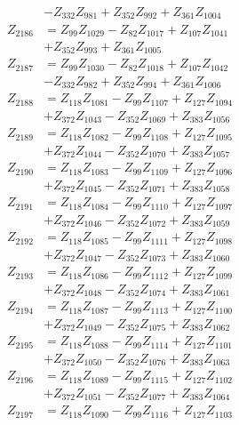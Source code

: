 \begin{multicols}{2}
\begin{align}
&- Z_{332}Z_{981} + Z_{352}Z_{992} + Z_{361}Z_{1004} \nonumber \\
Z_{2186} &= Z_{99}Z_{1029} - Z_{82}Z_{1017} + Z_{107}Z_{1041}  \nonumber \\
&+ Z_{352}Z_{993} + Z_{361}Z_{1005} \nonumber \\
Z_{2187} &= Z_{99}Z_{1030} - Z_{82}Z_{1018} + Z_{107}Z_{1042}  \nonumber \\
&- Z_{332}Z_{982} + Z_{352}Z_{994} + Z_{361}Z_{1006} \nonumber \\
Z_{2188} &= Z_{118}Z_{1081} - Z_{99}Z_{1107} + Z_{127}Z_{1094}  \nonumber \\
&+ Z_{372}Z_{1043} - Z_{352}Z_{1069} + Z_{383}Z_{1056} \nonumber \\
Z_{2189} &= Z_{118}Z_{1082} - Z_{99}Z_{1108} + Z_{127}Z_{1095}  \nonumber \\
&+ Z_{372}Z_{1044} - Z_{352}Z_{1070} + Z_{383}Z_{1057} \nonumber \\
Z_{2190} &= Z_{118}Z_{1083} - Z_{99}Z_{1109} + Z_{127}Z_{1096}  \nonumber \\
&+ Z_{372}Z_{1045} - Z_{352}Z_{1071} + Z_{383}Z_{1058} \nonumber \\
Z_{2191} &= Z_{118}Z_{1084} - Z_{99}Z_{1110} + Z_{127}Z_{1097}  \nonumber \\
&+ Z_{372}Z_{1046} - Z_{352}Z_{1072} + Z_{383}Z_{1059} \nonumber \\
Z_{2192} &= Z_{118}Z_{1085} - Z_{99}Z_{1111} + Z_{127}Z_{1098}  \nonumber \\
&+ Z_{372}Z_{1047} - Z_{352}Z_{1073} + Z_{383}Z_{1060} \nonumber \\
Z_{2193} &= Z_{118}Z_{1086} - Z_{99}Z_{1112} + Z_{127}Z_{1099}  \nonumber \\
&+ Z_{372}Z_{1048} - Z_{352}Z_{1074} + Z_{383}Z_{1061} \nonumber \\
Z_{2194} &= Z_{118}Z_{1087} - Z_{99}Z_{1113} + Z_{127}Z_{1100}  \nonumber \\
&+ Z_{372}Z_{1049} - Z_{352}Z_{1075} + Z_{383}Z_{1062} \nonumber \\
Z_{2195} &= Z_{118}Z_{1088} - Z_{99}Z_{1114} + Z_{127}Z_{1101}  \nonumber \\
&+ Z_{372}Z_{1050} - Z_{352}Z_{1076} + Z_{383}Z_{1063} \nonumber \\
Z_{2196} &= Z_{118}Z_{1089} - Z_{99}Z_{1115} + Z_{127}Z_{1102}  \nonumber \\
&+ Z_{372}Z_{1051} - Z_{352}Z_{1077} + Z_{383}Z_{1064} \nonumber \\
Z_{2197} &= Z_{118}Z_{1090} - Z_{99}Z_{1116} + Z_{127}Z_{1103}  \nonumber \\

\end{align}
\end{multicols}
